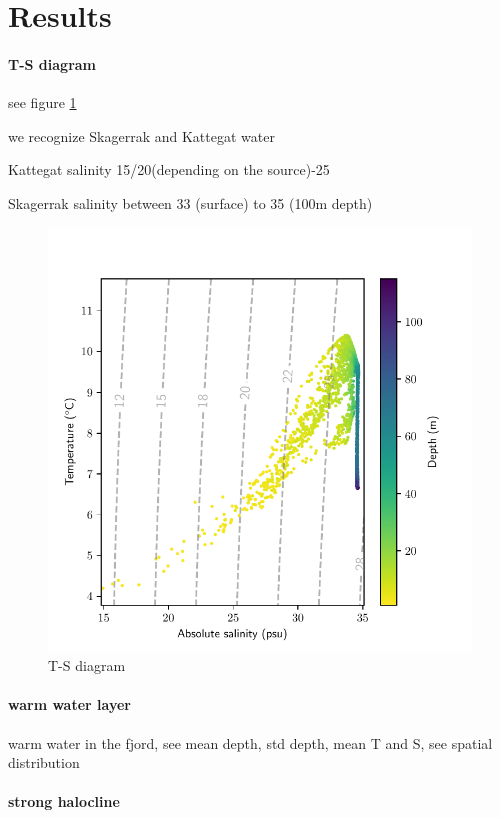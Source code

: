 \documentclass[12pt,a4paper]{article}
\begin{document}
\section{Results}

\paragraph{T-S diagram}
see figure \ref{fig:ts}

we recognize Skagerrak and Kattegat water \citep{bjork2003,gustafsson1996}

Kattegat salinity 15/20(depending on the source)-25

Skagerrak salinity between 33 (surface) to 35 (100m depth)

\begin{figure}
  \centering
  \includegraphics{ts}
  \caption{\label{fig:ts}T-S diagram}
\end{figure}

\paragraph{warm water layer}
warm water in the fjord, see mean depth, std depth, mean T and S, see spatial
distribution

\paragraph{strong halocline}
\end{document}
